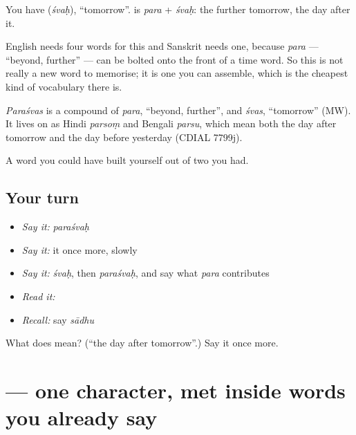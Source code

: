 You have \textbf{} (\emph{śvaḥ}), \textquotedblleft{}tomorrow\textquotedblright{}. \textbf{} is \emph{para} + \emph{śvaḥ}: the further tomorrow, the day after it.

English needs four words for this and Sanskrit needs one, because \emph{para} — \textquotedblleft{}beyond, further\textquotedblright{} — can be bolted onto the front of a time word. So this is not really a new word to memorise; it is one you can assemble, which is the cheapest kind of vocabulary there is.

\begin{cousinweb}
\emph{Paraśvas} is a compound of \emph{para}, \textquotedblleft{}beyond, further\textquotedblright{}, and \emph{śvas}, \textquotedblleft{}tomorrow\textquotedblright{} (MW). It lives on as Hindi \emph{parsoṃ} and Bengali \emph{parsu}, which mean both the day after tomorrow and the day before yesterday (CDIAL 7799j).
\end{cousinweb}

\begin{grammarlens}[title={What you've built}]
A word you could have built yourself out of two you had.
\end{grammarlens}

\subsection*{Your turn}
\begin{itemize}
\raggedright
  \item \emph{Say it:} \emph{paraśvaḥ}
  \item \emph{Say it:} it once more, slowly
  \item \emph{Say it:} \emph{śvaḥ}, then \emph{paraśvaḥ}, and say what \emph{para} contributes
  \item \emph{Read it:} \textbf{}
  \item \emph{Recall:} say \emph{sādhu}
\end{itemize}

\begin{tcolorbox}[breakable,colback=teal!4,colframe=teal!35!black,title={Before you move on}]
What does  mean? (\textquotedblleft{}the day after tomorrow\textquotedblright{}.) Say it once more.
\end{tcolorbox}
\section[\texorpdfstring{\sk{इ} (i)}{इ (i)}]{ — one character, met inside words you already say}

